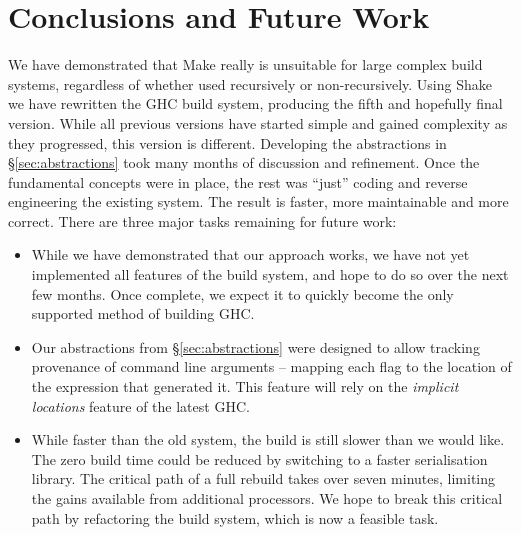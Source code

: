 \vspace{-1mm}
\section{Conclusions and Future Work\label{section-conclusions}}

We have demonstrated that Make really is unsuitable for large complex build
systems, regardless of whether used recursively or non-recursively. Using Shake
we have rewritten the GHC build system, producing the fifth and hopefully final
version. While all previous versions have started simple and gained complexity
as they progressed, this version is different. Developing the abstractions in
\S\ref{sec:abstractions} took many months of discussion and refinement. Once the
fundamental concepts were in place, the rest was ``just'' coding and reverse
engineering the existing system. The result is faster, more maintainable and
more correct. There are three major tasks remaining for future work:

\begin{itemize}
\item While we have demonstrated that our approach works, we have not yet
implemented all features of the build system, and hope to do so over the next
few months. Once complete, we expect it to quickly become the only supported
method of building GHC.

\item Our abstractions from \S\ref{sec:abstractions} were designed to allow
tracking provenance of command line arguments -- mapping each flag to the
location of the expression that generated it. This feature will rely on the
\emph{implicit locations} feature of the latest GHC.


\item While faster than the old system, the build is still slower than we would
like. The zero build time could be reduced by switching to a faster serialisation
library. The critical path of a full rebuild takes over seven minutes, limiting
the gains available from additional processors. We hope to break this critical path
by refactoring the build system, which is now a feasible task.
\end{itemize}
